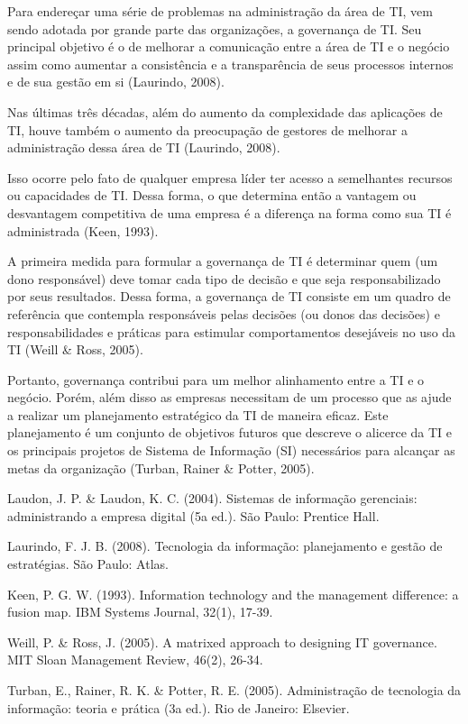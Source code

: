     Para endereçar uma série de problemas na administração da área de TI, vem sendo adotada por grande parte das organizações, a governança de TI. Seu principal objetivo é o de melhorar a comunicação entre a área de TI e o  negócio assim como aumentar a consistência e a transparência de seus processos internos e de sua gestão em si (Laurindo, 2008).

    Nas últimas três décadas, além do aumento da complexidade das aplicações de TI, houve também o aumento da preocupação de gestores de melhorar a administração dessa área de TI (Laurindo, 2008).

    Isso ocorre pelo fato de qualquer empresa líder ter acesso a semelhantes recursos ou capacidades de TI. Dessa forma, o que determina então a vantagem ou desvantagem competitiva de uma empresa é a diferença na forma como sua TI é administrada (Keen, 1993).

    A primeira medida para formular a governança de TI é determinar quem (um dono responsável) deve tomar cada tipo de decisão e que seja responsabilizado por seus resultados. Dessa forma, a governança de TI consiste em um quadro de referência que contempla responsáveis pelas decisões (ou donos das decisões) e responsabilidades e práticas para estimular comportamentos desejáveis no uso da TI (Weill & Ross, 2005).

    Portanto, governança contribui para um melhor alinhamento entre a TI e o negócio. Porém, além disso as empresas necessitam de um processo que as ajude a realizar um planejamento estratégico da TI de maneira eficaz. Este planejamento é um conjunto de objetivos futuros que descreve o alicerce da TI e os principais projetos de Sistema de Informação (SI) necessários para alcançar as metas da organização (Turban, Rainer & Potter, 2005).

    Laudon, J. P. & Laudon, K. C. (2004). Sistemas de informação gerenciais: administrando a empresa digital (5a ed.). São Paulo: Prentice Hall.

    Laurindo, F. J. B. (2008). Tecnologia da informação: planejamento e gestão de estratégias. São Paulo: Atlas.

    Keen, P. G. W. (1993). Information technology and the management difference: a fusion map. IBM Systems Journal, 32(1), 17-39.

    Weill, P. & Ross, J. (2005). A matrixed approach to designing IT governance. MIT Sloan Management Review, 46(2), 26-34.

    Turban, E., Rainer, R. K. & Potter, R. E. (2005). Administração de tecnologia da informação: teoria e prática (3a ed.). Rio de Janeiro: Elsevier.

